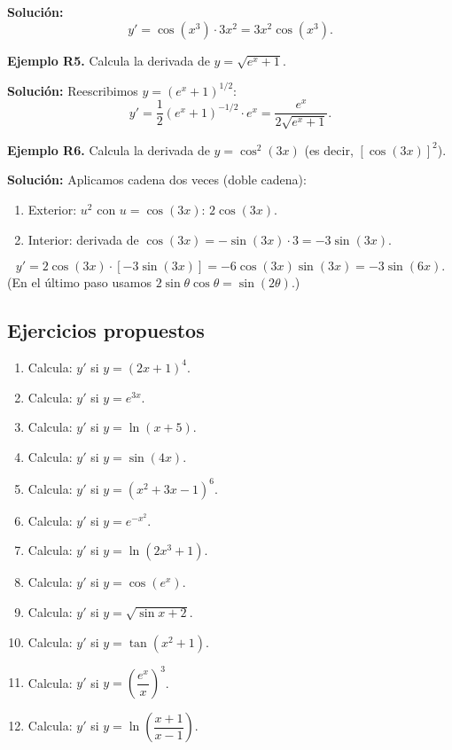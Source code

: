 \documentclass[12pt, a4paper]{article}
\begin{document}
\begin{cuadrosolucion}
  \textbf{Solución:}
  $$y' = \cos(x^3) \cdot 3x^2 = 3x^2 \cos(x^3).$$
\end{cuadrosolucion}

\textbf{Ejemplo R5.} Calcula la derivada de $y = \sqrt{e^x + 1}$.

\begin{cuadrosolucion}
  \textbf{Solución:} Reescribimos $y = (e^x + 1)^{1/2}$:
  $$y' = \frac{1}{2}(e^x + 1)^{-1/2} \cdot e^x = \frac{e^x}{2\sqrt{e^x + 1}}.$$
\end{cuadrosolucion}

\textbf{Ejemplo R6.} Calcula la derivada de $y = \cos^2(3x)$ (es decir, $[\cos(3x)]^2$).

\begin{cuadrosolucion}
  \textbf{Solución:} Aplicamos cadena dos veces (doble cadena):
  \begin{enumerate}
    \item Exterior: $u^2$ con $u = \cos(3x)$: $2\cos(3x)$.
    \item Interior: derivada de $\cos(3x) = -\sin(3x) \cdot 3 = -3\sin(3x)$.
  \end{enumerate}
  $$y' = 2\cos(3x) \cdot [-3\sin(3x)] = -6\cos(3x)\sin(3x) = -3\sin(6x).$$
  (En el último paso usamos $2\sin\theta\cos\theta = \sin(2\theta)$.)
\end{cuadrosolucion}


\subsection{Ejercicios propuestos}

\begin{enumerate}[leftmargin=*, resume]
  \item \facil{} Calcula: $y'$ si $y = (2x + 1)^4$.
  \item \facil{} Calcula: $y'$ si $y = e^{3x}$.
  \item \facil{} Calcula: $y'$ si $y = \ln(x + 5)$.
  \item \facil{} Calcula: $y'$ si $y = \sin(4x)$.
  \item \medio{} Calcula: $y'$ si $y = (x^2 + 3x - 1)^6$.
  \item \medio{} Calcula: $y'$ si $y = e^{-x^2}$.
  \item \medio{} Calcula: $y'$ si $y = \ln(2x^3 + 1)$.
  \item \medio{} Calcula: $y'$ si $y = \cos(e^x)$.
  \item \dificil{} Calcula: $y'$ si $y = \sqrt{\sin x + 2}$.
  \item \dificil{} Calcula: $y'$ si $y = \tan(x^2 + 1)$.
  \item \dificil{} Calcula: $y'$ si $y = \left(\dfrac{e^x}{x}\right)^3$.
  \item \dificil{} Calcula: $y'$ si $y = \ln\left(\dfrac{x + 1}{x - 1}\right)$.
\end{enumerate}
\end{document}
